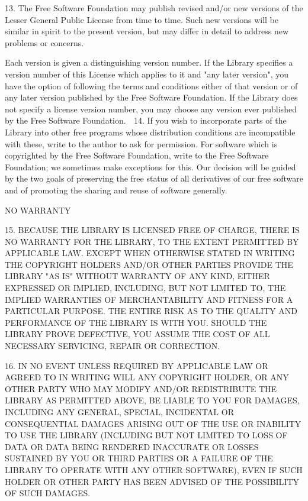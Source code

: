 \documentclass[a4paper,twoside,12pt]{book}
\begin{document}
  13. The Free Software Foundation may publish revised and/or new
versions of the Lesser General Public License from time to time.
Such new versions will be similar in spirit to the present version,
but may differ in detail to address new problems or concerns.

Each version is given a distinguishing version number.  If the Library
specifies a version number of this License which applies to it and
"any later version", you have the option of following the terms and
conditions either of that version or of any later version published by
the Free Software Foundation.  If the Library does not specify a
license version number, you may choose any version ever published by
the Free Software Foundation.

  14. If you wish to incorporate parts of the Library into other free
programs whose distribution conditions are incompatible with these,
write to the author to ask for permission.  For software which is
copyrighted by the Free Software Foundation, write to the Free
Software Foundation; we sometimes make exceptions for this.  Our
decision will be guided by the two goals of preserving the free status
of all derivatives of our free software and of promoting the sharing
and reuse of software generally.

			    NO WARRANTY

  15. BECAUSE THE LIBRARY IS LICENSED FREE OF CHARGE, THERE IS NO
WARRANTY FOR THE LIBRARY, TO THE EXTENT PERMITTED BY APPLICABLE LAW.
EXCEPT WHEN OTHERWISE STATED IN WRITING THE COPYRIGHT HOLDERS AND/OR
OTHER PARTIES PROVIDE THE LIBRARY "AS IS" WITHOUT WARRANTY OF ANY
KIND, EITHER EXPRESSED OR IMPLIED, INCLUDING, BUT NOT LIMITED TO, THE
IMPLIED WARRANTIES OF MERCHANTABILITY AND FITNESS FOR A PARTICULAR
PURPOSE.  THE ENTIRE RISK AS TO THE QUALITY AND PERFORMANCE OF THE
LIBRARY IS WITH YOU.  SHOULD THE LIBRARY PROVE DEFECTIVE, YOU ASSUME
THE COST OF ALL NECESSARY SERVICING, REPAIR OR CORRECTION.

  16. IN NO EVENT UNLESS REQUIRED BY APPLICABLE LAW OR AGREED TO IN
WRITING WILL ANY COPYRIGHT HOLDER, OR ANY OTHER PARTY WHO MAY MODIFY
AND/OR REDISTRIBUTE THE LIBRARY AS PERMITTED ABOVE, BE LIABLE TO YOU
FOR DAMAGES, INCLUDING ANY GENERAL, SPECIAL, INCIDENTAL OR
CONSEQUENTIAL DAMAGES ARISING OUT OF THE USE OR INABILITY TO USE THE
LIBRARY (INCLUDING BUT NOT LIMITED TO LOSS OF DATA OR DATA BEING
RENDERED INACCURATE OR LOSSES SUSTAINED BY YOU OR THIRD PARTIES OR A
FAILURE OF THE LIBRARY TO OPERATE WITH ANY OTHER SOFTWARE), EVEN IF
SUCH HOLDER OR OTHER PARTY HAS BEEN ADVISED OF THE POSSIBILITY OF SUCH
DAMAGES.
\end{document}
